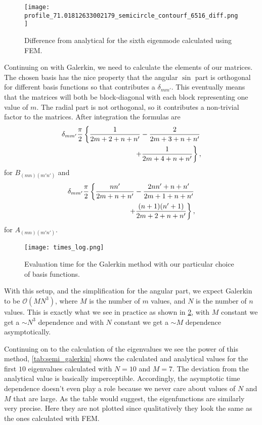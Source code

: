 \documentclass[10pt,a4paper,twocolumn]{article}
\begin{document}
\begin{figure}[!h]
    \centering
    \texttt{[image: profile\_71.01812633002179\_semicircle\_contourf\_6516\_diff.png]}
    \caption{Difference from analytical for the sixth eigenmode calculated using FEM.}
    \label{fig:profile_1_fem_err}
\end{figure}

Continuing on with Galerkin, we need to calculate the elements of our matrices. The chosen basis has the nice property that the angular $\sin$ part is orthogonal for different basis functions so that contributes a $\delta_{m m'}$. This eventually means that the matrices will both be block-diagonal with each block representing one value of $m$. The radial part is not orthogonal, so it contributes a non-trivial factor to the matrices. After integration the formulas are
%
\begin{align}
    \delta_{mm'} \frac{\pi}{2} \left\{ \frac{1}{2m+2+n+n'} - \frac{2}{2m+3+n+n'} \right. \notag\\ \left. + \frac{1}{2m+4+n+n'} \right\},
\end{align}
%
for $B_{(mn)(m'n')}$ and
%
\begin{align}
    \delta_{mm'} \frac{\pi}{2} \left\{ \frac{n n'}{2m+n+n'} - \frac{2nn'+n+n'}{2m+1+n+n'} \right. \notag\\ \left. + \frac{(n+1)(n'+1)}{2m+2+n+n'} \right\},
\end{align}
%
for $A_{(mn)(m'n')}$.

\begin{figure}[!h]
    \centering
    \texttt{[image: times\_log.png]}
    \caption{Evaluation time for the Galerkin method with our particular choice of basis functions.}
    \label{fig:gal_time_log}
\end{figure}

With this setup, and the simplification for the angular part, we expect Galerkin to be $\mathcal{O}(MN^3)$, where $M$ is the number of $m$ values, and $N$ is the number of $n$ values. This is exactly what we see in practice as shown in \cref{fig:gal_time_log}, with $M$ constant we get a $\sim\! N^3$ dependence and with $N$ constant we get a $\sim\! M$ dependence asymptotically.

Continuing on to the calculation of the eigenvalues we see the power of this method, \cref{tab:semi_galerkin} shows the calculated and analytical values for the first $10$ eigenvalues calculated with $N=10$ and $M=7$. The deviation from the analytical value is basically imperceptible. Accordingly, the asymptotic time dependence doesn't even play a role because we never care about values of $N$ and $M$ that are large. As the table would suggest, the eigenfunctions are similarly very precise. Here they are not plotted since qualitatively they look the same as the ones calculated with FEM.
\end{document}
